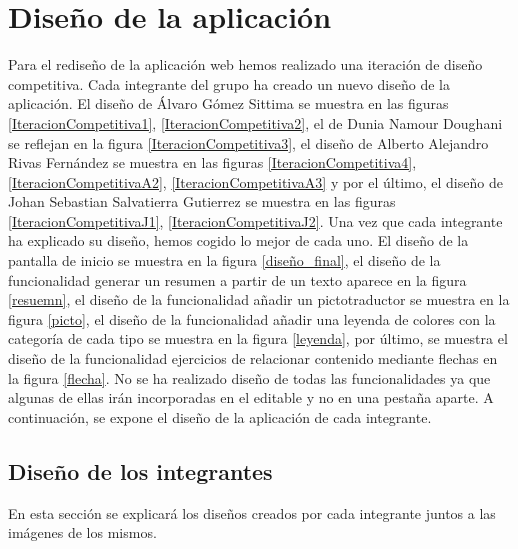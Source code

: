 \section{Diseño de la aplicación}
\label{disenyoDeLaAplicacion}
Para el rediseño de la aplicación web hemos realizado una iteración de diseño competitiva. Cada integrante del grupo ha creado un nuevo diseño de la aplicación. El diseño de Álvaro Gómez Sittima se muestra en las figuras \ref{IteracionCompetitiva1}, \ref{IteracionCompetitiva2}, el de Dunia Namour Doughani se reflejan en la figura \ref{IteracionCompetitiva3}, el diseño de Alberto Alejandro Rivas Fernández se muestra en las figuras \ref{IteracionCompetitiva4}, \ref{IteracionCompetitivaA2}, \ref{IteracionCompetitivaA3} y por el último, el diseño de Johan Sebastian Salvatierra Gutierrez se muestra en las figuras \ref{IteracionCompetitivaJ1}, \ref{IteracionCompetitivaJ2}. Una vez que cada integrante ha explicado su diseño, hemos cogido lo mejor de cada uno. El diseño de la pantalla de inicio se muestra en la figura \ref{diseño_final}, el diseño de la funcionalidad generar un resumen a partir de un texto aparece en la figura \ref{resuemn}, el diseño de la funcionalidad añadir un pictotraductor se muestra en la figura \ref{picto}, el diseño de la funcionalidad añadir una leyenda de colores con la categoría de cada tipo se muestra en la figura \ref{leyenda}, por último, se muestra el diseño de la funcionalidad ejercicios de relacionar contenido mediante flechas en la figura \ref{flecha}. No se ha realizado diseño de todas las funcionalidades ya que algunas de ellas irán incorporadas en el editable y no en una pestaña aparte. A continuación, se expone el diseño de la aplicación de cada integrante. 


\subsection{Diseño de los integrantes}
En esta sección se explicará los diseños creados por cada integrante juntos a las imágenes de los mismos. 
